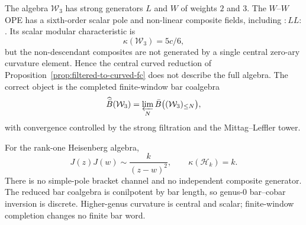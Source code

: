 \begin{example}\label{ex:w3-not-curved-fc}
The algebra $\mathcal{W}_3$ has strong generators $L$ and $W$ of
weights $2$ and $3$.  The $W$--$W$ OPE has a sixth-order scalar pole
and non-linear composite fields, including ${:}LL{:}$.  Its scalar
modular characteristic is
\[
\kappa(\mathcal{W}_3)=5c/6,
\]
but the non-descendant composites are not generated by a single
central zero-ary curvature element.  Hence the central curved
reduction of Proposition~\ref{prop:filtered-to-curved-fc} does not
describe the full algebra.  The correct object is the completed
finite-window bar coalgebra
\[
\widehat{\bar B}(\mathcal W_3)
=\varprojlim_N \bar B\bigl((\mathcal W_3)_{\le N}\bigr),
\]
with convergence controlled by the strong filtration and the
Mittag--Leffler tower.
\end{example}

\begin{example}
For the rank-one Heisenberg algebra,
\[
J(z)J(w)\sim\frac{k}{(z-w)^2},\qquad
\kappa(\mathcal H_k)=k.
\]
There is no simple-pole bracket channel and no independent composite
generator.  The reduced bar coalgebra is conilpotent by bar length,
so genus-$0$ bar--cobar inversion is discrete.  Higher-genus curvature
is central and scalar; finite-window completion changes no finite bar
word.
\end{example}

